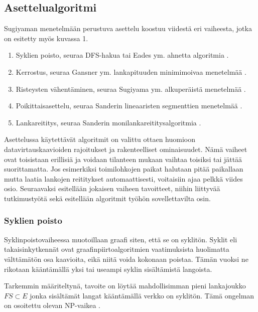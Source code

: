 \documentclass[finnish,12pt]{article}
\begin{document}
		\subsection{Asettelualgoritmi}

Sugiyaman menetelmään perustuva asettelu koostuu viidestä eri vaiheesta, jotka on esitetty myös kuvassa 1.
\begin{enumerate}
  \item Syklien poisto, seuraa DFS-hakua \cite{RefWorks:69} tai Eades ym. ahnetta algoritmia \cite{RefWorks:48}.
  \item Kerrostus, seuraa Gansner ym. lankapituuden minimimoivaa menetelmää \cite{RefWorks:28}.
  \item Risteysten vähentäminen, seuraa Sugiyama ym. alkuperäistä menetelmää \cite{RefWorks:9}.
  \item Poikittaisasettelu, seuraa Sanderin lineaaristen segmenttien menetelmää \cite{RefWorks:49}.
  \item Lankareititys, seuraa Sanderin monilankareititysalgoritmia \cite{RefWorks:17}.

\end{enumerate}

Asettelussa käytettävät algoritmit on valittu ottaen huomioon datavirtauskaavioiden rajoitukset ja rakenteelliset ominaisuudet.
Nämä vaiheet ovat toisistaan erillisiä ja voidaan tilanteen mukaan vaihtaa toisiksi tai jättää suorittamatta.
Jos esimerkiksi toimilohkojen paikat halutaan pitää paikallaan mutta laatia lankojen reititykset automaattisesti, voitaisiin ajaa pelkkä viides osio.
Seuraavaksi esitellään jokaisen vaiheen tavoitteet, niihin liittyvää tutkimustyötä sekä esitellään algoritmit työhön sovellettavilta osin.

		\subsubsection{Syklien poisto}

Syklinpoistovaiheessa muotoillaan graafi siten, että se on syklitön.
Syklit eli takaisinkytkennät ovat graafinpiirtoalgoritmien vaatimuksista huolimatta välttämätön osa kaavioita, eikä niitä voida kokonaan poistaa.
Tämän vuoksi ne rikotaan kääntämällä yksi tai useampi syklin sisältämistä langoista.

Tarkemmin määriteltynä, tavoite on löytää mahdollisimman pieni lankajoukko $FS \subset E $ jonka sisältämät langat kääntämällä verkko on syklitön.
Tämä ongelman on osoitettu olevan NP-vaikea \cite{RefWorks:65}. 
\end{document}
